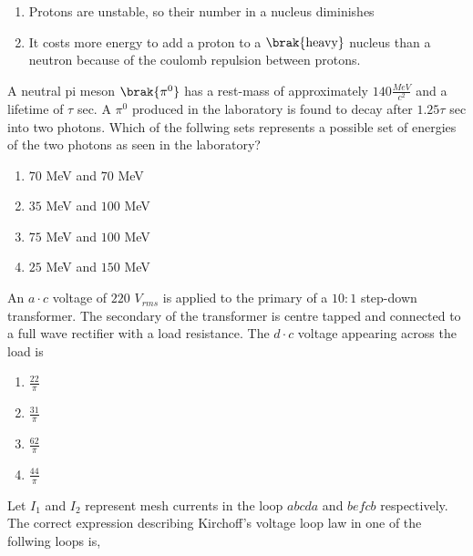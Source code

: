 {{\begin{enumerate}
\item Protons are unstable, so their number in a nucleus diminishes
\item It costs more energy to add a proton to a $\brak{\text{heavy}}$ nucleus than a neutron because of the coulomb repulsion between protons.
\end{enumerate}
}
\item{
A neutral pi meson $\brak{\pi^0}$ has a rest-mass of approximately $140\frac{MeV}{c^2}$ and a lifetime of $\tau$ sec. A $\pi^0$ produced in the laboratory is found to decay after $1.25\tau$ sec into two photons. Which of the follwing sets represents a possible set of energies of the two photons as seen in the laboratory?
\begin{multicols}{2}
\begin{enumerate}
\item $70$ MeV and $70$ MeV
\item $35$ MeV and $100$ MeV
\item $75$ MeV and $100$ MeV  
\item $25$ MeV and $150$ MeV
\end{enumerate}
\end{multicols}
}
\item{
An $a\cdot c$ voltage of $220$ $V_{rms}$ is applied to the primary of a $10:1$ step-down transformer. The secondary of the transformer is centre tapped and connected to a full wave rectifier with a load resistance. The $d\cdot c$ voltage appearing across the load is 
\begin{enumerate}
\item $\frac{22}{\pi}$
\item $\frac{31}{\pi}$
\item $\frac{62}{\pi}$
\item $\frac{44}{\pi}$
\end{enumerate}
}
\item{
Let $I_1$ and $I_2$ represent mesh currents in the loop $abcda$ and $befcb$ respectively. The correct expression describing Kirchoff's voltage loop law in one of the follwing loops is,
\begin{figure}[H]
\centering
{}
\end{figure}}}
